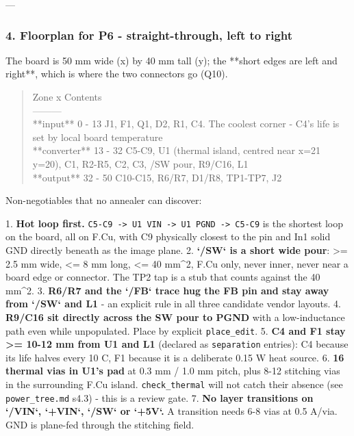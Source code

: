 \documentclass[11pt,a4paper]{article}
\begin{document}
---

\subsubsection*{4. Floorplan for P6 - straight-through, left to right}
The board is 50 mm wide (x) by 40 mm tall (y); the {*}{*}short edges are left and right{*}{*}, which is where the two connectors go (Q10).

\begin{quote}\small\ttfamily\raggedright
\textbar{} Zone \textbar{} x \textbar{} Contents \textbar{}\\
\textbar{}---\textbar{}---\textbar{}---\textbar{}\\
\textbar{} {*}{*}input{*}{*} \textbar{} 0 - 13 \textbar{} J1, F1, Q1, D2, R1, C4. The coolest corner - C4's life is set by local board temperature \textbar{}\\
\textbar{} {*}{*}converter{*}{*} \textbar{} 13 - 32 \textbar{} C5-C9, U1 (thermal island, centred near x=21 y=20), C1, R2-R5, C2, C3, /SW pour, R9/C16, L1 \textbar{}\\
\textbar{} {*}{*}output{*}{*} \textbar{} 32 - 50 \textbar{} C10-C15, R6/R7, D1/R8, TP1-TP7, J2 \textbar{}
\end{quote}
Non-negotiables that no annealer can discover:

1. \textbf{Hot loop first.} \texttt{C5-C9 -\textgreater{} U1 VIN -\textgreater{} U1 PGND -\textgreater{} C5-C9} is the shortest loop on the board, all on F.Cu, with C9 physically closest to the pin and In1 solid GND directly beneath as the image plane. 2. \textbf{`/SW` is a short wide pour}: \textgreater{}= 2.5 mm wide, \textless{}= 8 mm long, \textless{}= 40 mm\textasciicircum{}2, F.Cu only, never inner, never near a board edge or connector. The TP2 tap is a stub that counts against the 40 mm\textasciicircum{}2. 3. \textbf{R6/R7 and the `/FB` trace hug the FB pin and stay away from `/SW` and L1} - an explicit rule in all three candidate vendor layouts. 4. \textbf{R9/C16 sit directly across the SW pour to PGND} with a low-inductance path even while unpopulated. Place by explicit \texttt{place\_edit}. 5. \textbf{C4 and F1 stay \textgreater{}= 10-12 mm from U1 and L1} (declared as \texttt{separation} entries): C4 because its life halves every 10 C, F1 because it is a deliberate 0.15 W heat source. 6. \textbf{16 thermal vias in U1's pad} at 0.3 mm / 1.0 mm pitch, plus 8-12 stitching vias in the surrounding F.Cu island. \texttt{check\_thermal} will not catch their absence (see \texttt{power\_tree.md} s4.3) - this is a review gate. 7. \textbf{No layer transitions on `/VIN`, `+VIN`, `/SW` or `+5V`.} A transition needs 6-8 vias at 0.5 A/via. GND is plane-fed through the stitching field.
\end{document}
